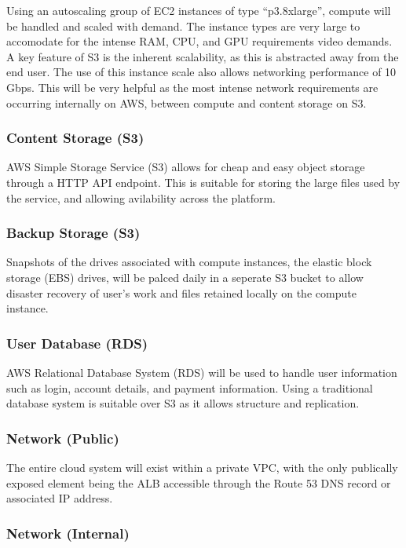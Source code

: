 Using an autoscaling group of EC2 instances of type ``p3.8xlarge'', compute will be handled and scaled with demand. The instance types are very large to accomodate for the intense RAM, CPU, and GPU requirements video demands. A key feature of S3 is the inherent scalability, as this is abstracted away from the end user. The use of this instance scale also allows networking performance of 10 Gbps. This will be very helpful as the most intense network requirements are occurring internally on AWS, between compute and content storage on S3.

\subsubsection*{Content Storage (S3)}

AWS Simple Storage Service (S3) allows for cheap and easy object storage through a HTTP API endpoint. This is suitable for storing the large files used by the service, and allowing avilability across the platform.

\subsubsection*{Backup Storage (S3)}

Snapshots of the drives associated with compute instances, the elastic block storage (EBS) drives, will be palced daily in a seperate S3 bucket to allow disaster recovery of user's work and files retained locally on the compute instance.

\subsubsection*{User Database (RDS)}

AWS Relational Database System (RDS) will be used to handle user information such as login, account details, and payment information. Using a traditional database system is suitable over S3 as it allows structure and replication.

\subsubsection*{Network (Public)}

The entire cloud system will exist within a private VPC, with the only publically exposed element being the ALB accessible through the Route 53 DNS record or associated IP address.

\subsubsection*{Network (Internal)}

